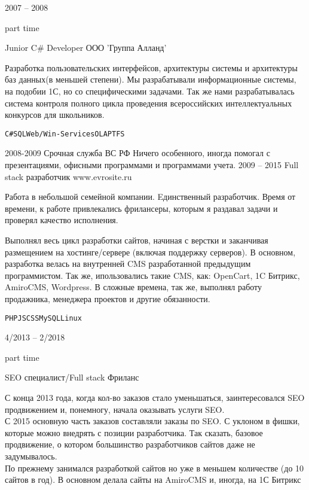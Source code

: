 \documentclass[10pt]{tpl/developercv} %
\begin{document}



\begin{entrylist}
	\entry
		{2007 -- 2008

		\footnotesize{part time}}
		{Junior C\# Developer}
		{ООО 'Группа Алланд'}
		{Разработка пользовательских интерфейсов, архитектуры системы и архитектуры баз данных(в меньшей степени). Мы разрабатывали информационные системы, на подобии 1С, но со специфическими задачами. Так же нами разрабатывалась система контроля полного цикла проведения всероссийских интеллектуальных конкурсов для школьников.

		\texttt{C\#}\slashsep\texttt{SQL}\slashsep\texttt{Web/Win-Services}\slashsep\texttt{OLAP}\slashsep\texttt{TFS}}
	\entry
		{2008-2009}
		{Срочная служба}
		{ВС РФ}
		{Ничего особенного, иногда помогал с презентациями, офисными программами и программами учета.}
	\entry
		{2009 -- 2015}
		{Full stack разработчик}
		{www.evrosite.ru}
		{Работа в небольшой семейной компании. Eдинственный разработчик. Время от времени, к работе привлекались фрилансеры, которым я раздавал задачи и проверял качество исполнения.

		Выполнял весь цикл разработки сайтов, начиная с верстки и заканчивая размещением на хостинге/сервере (включая поддержку серверов). В основном, разработка велась на внутренней CMS разработанной предыдущим программистом. Так же, ипользовались такие CMS, как: OpenCart, 1C Битрикс, AmiroCMS, Wordpress. В сложные времена, так же, выполнял работу продажника, менеджера проектов и другие обязанности.

		\texttt{PHP}\slashsep\texttt{JS}\slashsep\texttt{CSS}\slashsep\texttt{MySQL}\slashsep\texttt{Linux}}

	\entry
		{4/2013 -- 2/2018

		\footnotesize{part time}}
		{SEO специалист/Full stack}
		{Фриланс}
		{С конца 2013 года, когда кол-во заказов стало уменьшаться, заинтересовался SEO продвижением и, понемногу, начала оказывать услуги SEO.\\
		С 2015 основную часть заказов составляли заказы по SEO. С уклоном в фишки, которые можно внедрять с позиции разработчика. Так сказать, базовое продвижение, о котором большинство разработчиков сайтов даже не задумывалось.\\
		По прежнему занимался разработкой сайтов но уже в меньшем количестве (до 10 сайтов в год). В основном делала сайты на AmiroCMS и, иногда, на 1С Битрикс

}
\end{entrylist}
\end{document}
